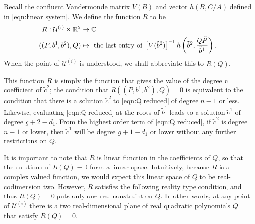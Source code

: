 \documentclass{article}
\begin{document}
\begin{defn}
\label{def:def R}
Recall the confluent Vandermonde matrix $V(B)$ and vector $h(B,C/A)$ defined in \eqref{eqn:linear system}. We define the function $R$ to be
\begin{align*}
R : \mathcal{U}^{(i)} \times \mathbb{R}^3 &\to \mathbb{C} \\
((P,b^1,b^2), Q) &\mapsto \text{ the last entry of } \left[V( \tilde{b}^2 )\right]^{-1}
h\left(\tilde{b}^2, \frac{Q\tilde{P}}{\tilde{b}^1} \right).
\end{align*}
When the point of $\mathcal{U}^{(i)}$ is understood, we shall abbreviate this to $R(Q)$.
\end{defn}

This function $R$ is simply the function that gives the value of the degree $n$ coefficient of $\tilde{c}^2$; the condition that $R((P,b^1,b^2),Q) = 0$ is equivalent to the condition that there is a solution $\tilde{c}^2$ to \eqref{eqn:Q reduced} of degree $n-1$ or less.
Likewise, evaluating \eqref{eqn:Q reduced} at the roots of $\tilde{b}^1$ leads to a solution $\tilde{c}^1$ of degree $g+2 - d_1$. From the highest order term of \eqref{eqn:Q reduced}, if $\tilde{c}^2$ is degree $n-1$ or lower, then $\tilde{c}^1$ will be degree $g + 1 - d_1$ or lower without any further restrictions on $Q$.

It is important to note that $R$ is linear function in the coefficients of $Q$, so that the solutions of $R(Q)=0$ form a linear space. Intuitively, because $R$ is a complex valued function, we would expect this linear space of $Q$ to be real-codimension two. However, $R$ satisfies the following reality type condition, and thus $R(Q)=0$ puts only one real constraint on $Q$. In other words, at any point of $\mathcal{U}^{(i)}$ there is a two real-dimensional plane of real quadratic polynomials $Q$ that satisfy $R(Q) = 0$.
\end{document}
